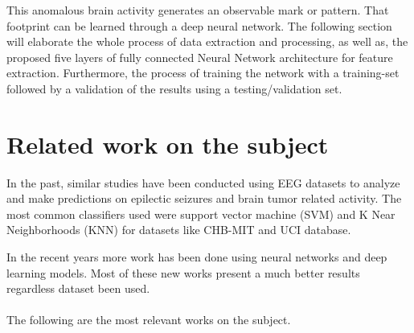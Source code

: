 \documentclass{llncs}       %
\begin{document}
This anomalous brain activity generates an observable mark or pattern. That footprint can be learned through a deep neural network. The following section will elaborate the whole process of data extraction and processing, as well as, the proposed five layers of fully connected Neural Network architecture for feature extraction. Furthermore, the process of training the network with a training-set followed by a validation of the results using a testing/validation set. 

\paragraph{}\paragraph{}

\section{Related work on the subject}
\label{sec:1}

 In the past, similar studies have been conducted using EEG datasets to analyze and make predictions on epilectic seizures and brain tumor related activity. The most common classifiers used were support vector machine (SVM) and K Near Neighborhoods (KNN) for datasets like CHB-MIT and UCI database. 

In the recent years more work has been done using neural networks and deep learning models.  Most of these new works present a much better results regardless dataset been used.

\paragraph{}
The following are the most relevant works on the subject.
\end{document}
